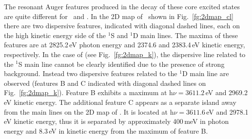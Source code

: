 The resonant Auger features produced in the decay of these core excited states are quite different for \cli~and \ki. In the 2D map of \cli~shown in Fig.\ \ref{fg:2dmap_cl} there are two dispersive features, indicated with diagonal dashed lines, each on the high kinetic energy side of the $^1$S and $^1$D main lines. The maxima of these features are at 2825.2\,eV photon energy and 2374.6 and 2383.4\,eV kinetic energy, respectively. In the case of \ki (see Fig.\ \ref{fg:2dmap_k}), the dispersive line related to the $^1$S main line cannot be clearly identified due to the presence of strong background. Instead two dispersive features related to the $^1$D main line are observed (features B and C indicated with diagonal dashed lines on Fig.\ \ref{fg:2dmap_k}). Feature B exhibits a maximum at h$\nu = 3611.2$\,eV and 2969.2\,eV kinetic energy. The additional feature C appears as a separate island away from the main lines on the 2D map of \ki. It is located at h$\nu = 3611.6$\,eV and 2978.1\,eV kinetic energy, thus it is separated by approximately 400\,meV in photon energy and 8.3\,eV in kinetic energy from the maximum of feature B. 

